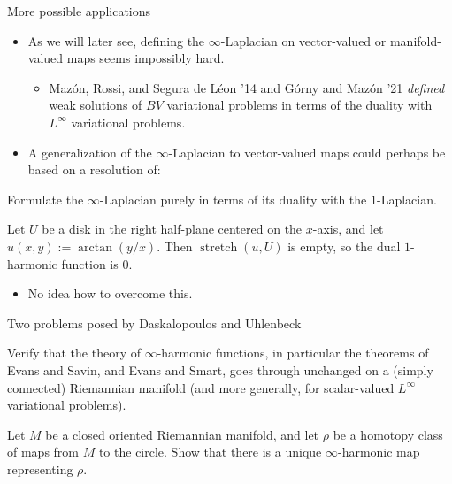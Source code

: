 \documentclass[10pt]{beamer}
\DeclareMathOperator{\Stretch}{stretch}
\begin{document}
\begin{frame}{More possible applications}
    
\begin{itemize}
\item As we will later see, defining the $\infty$-Laplacian on vector-valued or manifold-valued maps seems impossibly hard.
\begin{itemize}
\item Maz\'on, Rossi, and Segura de L\'eon '14 and G\'orny and Maz\'on '21 \emph{defined} weak solutions of $BV$ variational problems in terms of the duality with $L^\infty$ variational problems.
\end{itemize}
\item A generalization of the $\infty$-Laplacian to vector-valued maps could perhaps be based on a resolution of:
\end{itemize}

\begin{problem}
Formulate the $\infty$-Laplacian purely in terms of its duality with the $1$-Laplacian.
\end{problem}

\begin{example}
Let $U$ be a disk in the right half-plane centered on the $x$-axis, and let $u(x, y) := \arctan(y/x)$.
Then $\Stretch(u, U)$ is empty, so the dual $1$-harmonic function is $0$.
\end{example}
    
\begin{itemize}
\item No idea how to overcome this.
\end{itemize}

\end{frame}

\begin{frame}{Two problems posed by Daskalopoulos and Uhlenbeck}
\begin{problem}
Verify that the theory of $\infty$-harmonic functions, in particular the theorems of Evans and Savin, and Evans and Smart, goes through unchanged on a (simply connected) Riemannian manifold (and more generally, for scalar-valued $L^\infty$ variational problems).
\end{problem}

\begin{problem}
Let $M$ be a closed oriented Riemannian manifold, and let $\rho$ be a homotopy class of maps from $M$ to the circle.
Show that there is a unique $\infty$-harmonic map representing $\rho$.
\end{problem}
\end{frame}
\end{document}
